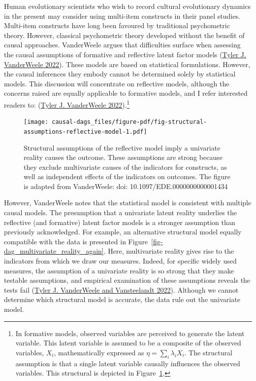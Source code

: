 \documentclass[
  singlecolumn]{article}
\begin{document}
Human evolutionary scientists who wish to record cultural evolutionary
dynamics in the present may consider using multi-item constructs in
their panel studies. Multi-item constructs have long been favoured by
traditional psychometric theory. However, classical psychometric theory
developed without the benefit of causal approaches. VanderWeele argues
that difficulties surface when assessing the causal assumptions of
formative and reflective latent factor models
(\protect\hyperlink{ref-vanderweele2022}{Tyler J. VanderWeele 2022}).
These models are based on statistical formulations. However, the causal
inferences they embody cannot be determined solely by statistical
models. This discussion will concentrate on reflective models, although
the concerns raised are equally applicable to formative models, and I
refer interested readers to:
(\protect\hyperlink{ref-vanderweele2022}{Tyler J. VanderWeele
2022}).\footnote{In formative models, observed variables are perceived
  to generate the latent variable. This latent variable is assumed to be
  a composite of the observed variables, \(X_i\), mathematically
  expressed as \(\eta = \sum_i\lambda_i X_i\). The structural assumption
  is that a single latent variable causally influences the observed
  variables. This structural is depicted in
  Figure~\ref{fig-structural-assumptions-reflective-model}.}

\begin{figure}

{\centering \texttt{[image: causal-dags\_files/figure-pdf/fig-structural-assumptions-reflective-model-1.pdf]}

}

\caption{\label{fig-structural-assumptions-reflective-model}Structural
assumptions of the reflective model imply a univariate reality causes
the outcome. These assumptions are strong because they exclude
multivariate causes of the indicators for constructs, as well as
independent effects of the indicators on outcomes. The figure is adapted
from VanderWeele: doi: 10.1097/EDE.0000000000001434}

\end{figure}

However, VanderWeele notes that the statistical model is consistent with
multiple causal models. The presumption that a univariate latent reality
underlies the reflective (and formative) latent factor models is a
stronger assumption than previously acknowledged. For example, an
alternative structural model equally compatible with the data is
presented in Figure~\ref{fig-dag_multivariate_reality_again}. Here,
multivariate reality gives rise to the indicators from which we draw our
measures. Indeed, for specific widely used measures, the assumption of a
univariate reality is so strong that they make testable assumptions, and
empirical examination of these assumptions reveals the tests fail
(\protect\hyperlink{ref-vanderweele2022b}{Tyler J. VanderWeele and
Vansteelandt 2022}). Although we cannot determine which structural model
is accurate, the data rule out the univariate model.
\end{document}
